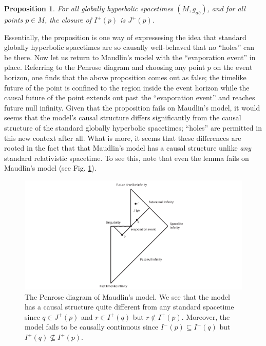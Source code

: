 \documentclass[authoryear,12pt,3p]{jowarticle}
\newtheorem{prop}[thm]{Proposition}
\begin{document}
\begin{prop}For all globally hyperbolic spacetimes $(M,g_{ab})$, and for all points $p \in M$, the closure of $I^+(p)$ is $J^+(p)$. \end{prop}

Essentially, the proposition is one way of expressesing the idea that standard globally hyperbolic spacetimes are so causally well-behaved that no ``holes'' can be there. Now let us return to Maudlin's model with the ``evaporation event'' in place. Referring to the Penrose diagram and choosing any point $p$ on the event horizon, one finds that the above proposition comes out as false; the timelike future of the point is confined to the region inside the event horizon while the causal future of the point extends out past the ``evaporation event'' and reaches future null infinity. Given that the proposition fails on Maudlin's model, it would seems that the model's causal structure differs significantly from the causal structure of the standard globally hyperbolic spacetimes;  ``holes'' are permitted in this new context after all. What is more, it seems that these differences are rooted in the fact that that Maudlin's model has a causal structure unlike {\em any} standard relativistic spacetime. To see this, note that even the lemma fails on Maudlin's model (see Fig. \ref{CausCon}).

\begin{figure}[h]    \centering
   \includegraphics[width=7in]{ManchakBH3.pdf}
   \caption{\label{CausCon} The Penrose diagram of Maudlin's model. We see that the model has a causal structure quite different from any standard spacetime since $q \in J^+(p)$ and $r \in I^+(q)$ but $r \notin I^+(p)$. Moreover, the model fails to be causally continuous since $I^-(p) \subseteq I^-(q)$ but $I^+(q) \nsubseteq I^+(p)$.  }
\end{figure}
\end{document}
